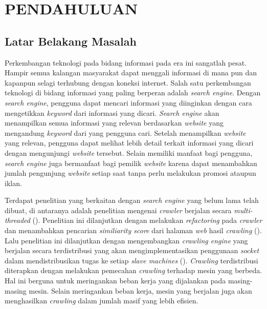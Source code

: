 
\chapter{PENDAHULUAN}

\section{Latar Belakang Masalah}

Perkembangan teknologi pada bidang informasi pada era ini sangatlah pesat. 
Hampir semua kalangan masyarakat dapat menggali informasi di mana pun dan kapanpun 
selagi terhubung dengan koneksi internet. Salah satu perkembangan teknologi di bidang 
informasi yang paling berperan adalah \emph{search engine}. Dengan \emph{search engine}, 
pengguna dapat mencari informasi yang diinginkan dengan cara mengetikkan 
\emph{keyword} dari informasi yang dicari. \emph{Search engine} akan menampilkan semua 
informasi yang relevan berdasarkan \emph{website} yang mengandung \emph{keyword} dari yang 
pengguna cari. Setelah menampilkan \emph{website} yang relevan, pengguna dapat melihat 
lebih detail terkait informasi yang dicari dengan mengunjungi \emph{website} tersebut. 
Selain memiliki manfaat bagi pengguna, \emph{search engine} juga bermanfaat bagi 
pemilik \emph{website} karena dapat menambahkan jumlah pengunjung \emph{website} setiap 
saat tanpa perlu melakukan promosi ataupun iklan.

Terdapat penelitian yang berkaitan dengan \emph{search engine} yang belum lama telah dibuat, 
di antaranya adalah penelitian mengenai \emph{crawler} berjalan secara \emph{multi-threaded} (\cite{fathan2021crawler}). 
Penelitian ini dilanjutkan dengan melakukan \emph{refactoring}  pada \emph{crawler} dan menambahkan 
pencarian \emph{similiarity score} dari halaman \emph{web} hasil \emph{crawling} (\cite{lazuardy2023}).  Lalu 
penelitian ini dilanjutkan dengan mengembangkan \emph{crawling engine} yang berjalan secara 
terdistribusi yang akan mengimplementasikan penggunaan \emph{socket} dalam mendistribusikan tugas 
ke setiap \emph{slave machines} (\cite{ridho2024}). \emph{Crawling} terdistribusi diterapkan dengan melakukan 
pemecahan \emph{crawling} terhadap mesin yang berbeda. Hal ini berguna untuk meringankan beban 
kerja yang dijalankan pada masing-masing mesin. Selain meringankan beban kerja, mesin yang 
berjalan juga akan menghasilkan \emph{crawling} dalam jumlah masif yang lebih efisien. 

